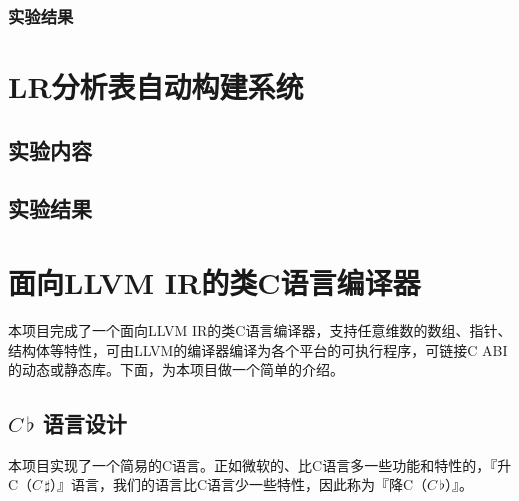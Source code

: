 \documentclass{ctexrep}
\newcommand{\cb}{$C\,\flat$\xspace}
\newcommand{\cs}{$C\,\sharp$\xspace}
\begin{document}
\subsection{实验结果}

\chapter{LR分析表自动构建系统}
\section{实验内容}
\section{实验结果}

\chapter{面向LLVM IR的类C语言编译器}
本项目完成了一个面向LLVM IR\cite{lattnerLLVMCompilationFramework2004}的类C语言编译器，支持任意维数的数组、指针、结构体等特性，可由LLVM的编译器编译为各个平台的可执行程序，可链接C ABI的动态或静态库。下面，为本项目做一个简单的介绍。
\section{\cb 语言设计}
本项目实现了一个简易的C语言。正如微软的、比C语言多一些功能和特性的，『升C（\cs）』语言，我们的语言比C语言少一些特性，因此称为『降C（\cb）』。
\end{document}
